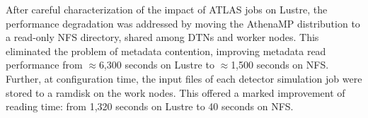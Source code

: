 
%
%


After careful characterization of the impact of ATLAS jobs on Lustre, the
performance degradation was addressed by moving the AthenaMP distribution to a
read-only NFS directory, shared among DTNs and worker nodes. This eliminated the
problem of metadata contention, improving metadata read performance from
$\approx$6,300 seconds on Lustre to $\approx$1,500 seconds on NFS. Further, at
configuration time, the input files of each detector simulation job were stored
to a ramdisk on the work nodes. This offered a marked improvement of reading
time: from 1,320 seconds on Lustre to 40 seconds on NFS.

